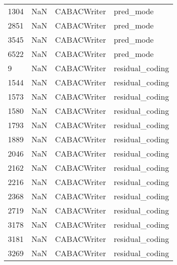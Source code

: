 \begin{tabular}{llll}
1304 &                   NaN &                CABACWriter &                                 pred\_mode \\
2851 &                   NaN &                CABACWriter &                                 pred\_mode \\
3545 &                   NaN &                CABACWriter &                                 pred\_mode \\
6522 &                   NaN &                CABACWriter &                                 pred\_mode \\
9    &                   NaN &                CABACWriter &                           residual\_coding \\
1544 &                   NaN &                CABACWriter &                           residual\_coding \\
1573 &                   NaN &                CABACWriter &                           residual\_coding \\
1580 &                   NaN &                CABACWriter &                           residual\_coding \\
1793 &                   NaN &                CABACWriter &                           residual\_coding \\
1889 &                   NaN &                CABACWriter &                           residual\_coding \\
2046 &                   NaN &                CABACWriter &                           residual\_coding \\
2162 &                   NaN &                CABACWriter &                           residual\_coding \\
2216 &                   NaN &                CABACWriter &                           residual\_coding \\
2368 &                   NaN &                CABACWriter &                           residual\_coding \\
2719 &                   NaN &                CABACWriter &                           residual\_coding \\
3178 &                   NaN &                CABACWriter &                           residual\_coding \\
3181 &                   NaN &                CABACWriter &                           residual\_coding \\
3269 &                   NaN &                CABACWriter &                           residual\_coding \\

\end{tabular}
